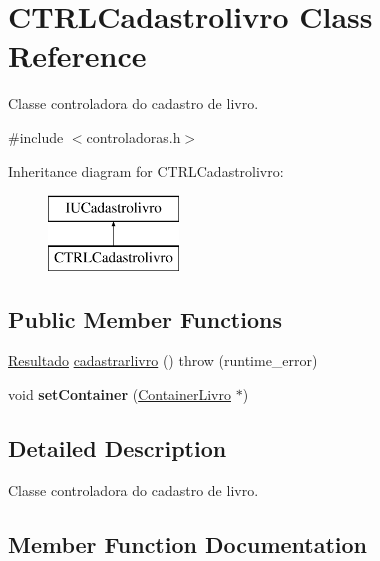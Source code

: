 \hypertarget{classCTRLCadastrolivro}{}\section{C\+T\+R\+L\+Cadastrolivro Class Reference}
\label{classCTRLCadastrolivro}


Classe controladora do cadastro de livro.  




{\ttfamily \#include $<$controladoras.\+h$>$}

Inheritance diagram for C\+T\+R\+L\+Cadastrolivro\+:\begin{figure}[H]
\begin{center}
\leavevmode
\includegraphics[height=2.000000cm]{classCTRLCadastrolivro}
\end{center}
\end{figure}
\subsection*{Public Member Functions}
\begin{DoxyCompactItemize}
\item 
\hyperlink{classResultado}{Resultado} \hyperlink{classCTRLCadastrolivro_ad932abd7bd49e2a5fbf4ba137c4df381}{cadastrarlivro} ()  throw (runtime\+\_\+error)
\item 
\mbox{\label{classCTRLCadastrolivro_aabb75fa8e3d9d4b81df8de87debabe20}} 
void {\bfseries set\+Container} (\hyperlink{classContainerLivro}{Container\+Livro} $\ast$)
\end{DoxyCompactItemize}


\subsection{Detailed Description}
Classe controladora do cadastro de livro. 

\subsection{Member Function Documentation}
\mbox{\label{classCTRLCadastrolivro_ad932abd7bd49e2a5fbf4ba137c4df381}} 

